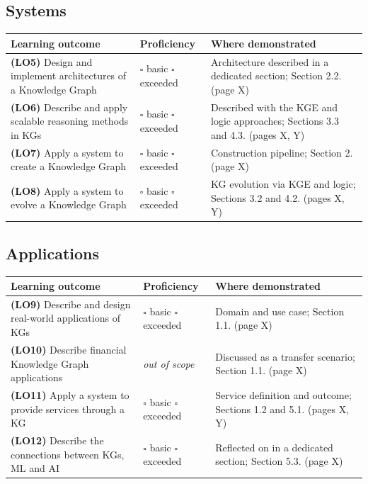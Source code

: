 \documentclass{article}
\begin{document}
\subsection*{Systems}
\begin{table}[h]
\centering
\begin{tabular}{p{4.6cm}p{3.0cm}p{4.2cm}}
\toprule
\textbf{Learning outcome} & \textbf{Proficiency} & \textbf{Where demonstrated} \\
\midrule
\textbf{(LO5)} Design and implement architectures of a Knowledge Graph &
$\square$ basic \newline $\square$ exceeded &
Architecture described in a dedicated section; Section 2.2. (page X) \\
\addlinespace
\textbf{(LO6)} Describe and apply scalable reasoning methods in KGs &
$\square$ basic \newline $\square$ exceeded &
Described with the KGE and logic approaches; Sections 3.3 and 4.3. (pages X, Y) \\
\addlinespace
\textbf{(LO7)} Apply a system to create a Knowledge Graph &
$\square$ basic \newline $\square$ exceeded &
Construction pipeline; Section 2. (page X) \\
\addlinespace
\textbf{(LO8)} Apply a system to evolve a Knowledge Graph &
$\square$ basic \newline $\square$ exceeded &
KG evolution via KGE and logic; Sections 3.2 and 4.2. (pages X, Y) \\
\bottomrule
\end{tabular}
\end{table}

\subsection*{Applications}
\begin{table}[h]
\centering
\begin{tabular}{p{4.6cm}p{3.0cm}p{4.2cm}}
\toprule
\textbf{Learning outcome} & \textbf{Proficiency} & \textbf{Where demonstrated} \\
\midrule
\textbf{(LO9)} Describe and design real-world applications of KGs &
$\square$ basic \newline $\square$ exceeded &
Domain and use case; Section 1.1. (page X) \\
\addlinespace
\textbf{(LO10)} Describe financial Knowledge Graph applications &
\textit{out of scope} &
Discussed as a transfer scenario; Section 1.1. (page X) \\
\addlinespace
\textbf{(LO11)} Apply a system to provide services through a KG &
$\square$ basic \newline $\square$ exceeded &
Service definition and outcome; Sections 1.2 and 5.1. (pages X, Y) \\
\addlinespace
\textbf{(LO12)} Describe the connections between KGs, ML and AI &
$\square$ basic \newline $\square$ exceeded &
Reflected on in a dedicated section; Section 5.3. (page X) \\
\bottomrule
\end{tabular}
\end{table}
\end{document}
